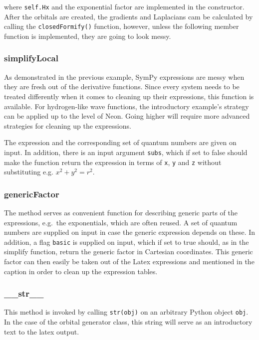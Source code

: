where \verb+self.Hx+ and the exponential factor are implemented in the constructor. After the orbitals are created, the gradients and Laplacians cam be calculated by calling the \verb+closedFormify()+ function, however, unless the following member function is implemented, they are going to look messy.

\subsubsection{simplifyLocal}

As demonstrated in the previous example, SymPy expressions are messy when they are fresh out of the derivative functions. Since every system needs to be treated differently when it comes to cleaning up their expressions, this function is available. For hydrogen-like wave functions, the introductory example's strategy can be applied up to the level of Neon. Going higher will require more advanced strategies for cleaning up the expressions.

The expression and the corresponding set of quantum numbers are given on input. In addition, there is an input argument \verb+subs+, which if set to false should make the function return the expression in terms of \verb+x+, \verb+y+ and \verb+z+ without substituting e.g. $x^2 + y^2 = r^2$.

\subsubsection{genericFactor}

The method serves as convenient function for describing generic parts of the expressions, e.g.~the exponentials, which are often reused. A set of quantum numbers are supplied on input in case the generic expression depends on these. In addition, a flag \verb+basic+ is supplied on input, which if set to true should, as in the simplify function, return the generic factor in Cartesian coordinates. This generic factor can then easily be taken out of the Latex expressions and mentioned in the caption in order to clean up the expression tables.

\subsubsection{\_\_str\_\_}

This method is invoked by calling \verb+str(obj)+ on an arbitrary Python object \verb+obj+. In the case of the orbital generator class, this string will serve as an introductory text to the latex output.

